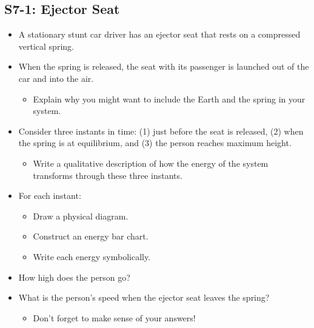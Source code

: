 \documentclass[]{article}
\begin{document}
\begin{PresentSpace}
\vspace{-10pt}
\section*{S7-1: Ejector Seat}
\vspace{-10pt}
\begin{itemize}
	\large
	\item A stationary stunt car driver has an ejector seat that rests on a compressed vertical spring.
	\item When the spring is released, the seat with its passenger is launched out of the car and into the air.
	\begin{itemize}
		\normalsize
		\item Explain why you might want to include the Earth and the spring in your system.
	\end{itemize}
	\item Consider three instants in time: (1) just before the seat is released, (2) when the spring is at equilibrium, and (3) the person reaches maximum height.
	\begin{itemize}
		\normalsize
		\item Write a qualitative description of how the energy of the system transforms through these three instants.
	\end{itemize}
	\item For each instant:
	\begin{itemize}
		\normalsize
		\item Draw a physical diagram.
		\item Construct an energy bar chart.
		\item Write each energy symbolically.
	\end{itemize}
	\item How high does the person go?
	\item What is the person's speed when the ejector seat leaves the spring?
	\begin{itemize}
		\item Don't forget to make sense of your answers!
	\end{itemize}
\end{itemize}
\end{PresentSpace}
\newpage
\begin{TeacherMargin}

\end{TeacherMargin}
\end{document}
